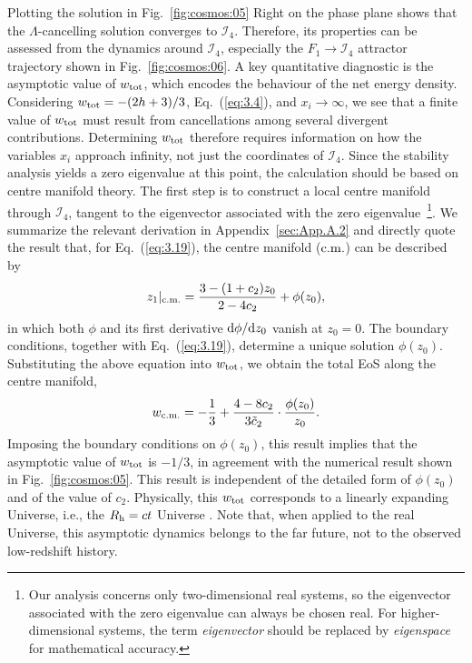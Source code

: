 \documentclass[aps,prd,twocolumn]{revtex4-2}
\newcommand\dx{{\rm d}}
\newcommand\subcm{{\rm c.m.}}
\newcommand\subtot{{\rm tot}}
\begin{document}
Plotting the solution in Fig.~\ref{fig:cosmos:05} Right on the phase plane shows that the $\Lambda$-cancelling solution converges to $\mathcal{I}_4$. Therefore, its properties can be assessed from the dynamics around $\mathcal{I}_4$, especially the $F_1\rightarrow\mathcal{I}_4$ attractor trajectory shown in Fig.~\ref{fig:cosmos:06}. A key quantitative diagnostic is the asymptotic value of $w_\subtot$, which encodes the behaviour of the net energy density. Considering $w_\subtot=-(2h+3)/3$, Eq.~(\ref{eq:3.4}), and $x_i\rightarrow\infty$, we see that a finite value of $w_\subtot$ must result from cancellations among several divergent contributions. Determining $w_\subtot$ therefore requires information on how the variables $x_i$ approach infinity, not just the coordinates of $\mathcal{I}_4$. Since the stability analysis yields a zero eigenvalue at this point, the calculation should be based on centre manifold theory. The first step is to construct a local centre manifold through $\mathcal{I}_4$, tangent to the eigenvector associated with the zero eigenvalue~\footnote{Our analysis concerns only two-dimensional real systems, so the eigenvector associated with the zero eigenvalue can always be chosen real. For higher-dimensional systems, the term \textit{eigenvector} should be replaced by \textit{eigenspace} for mathematical accuracy.}. We summarize the relevant derivation in Appendix~\ref{sec:App.A.2} and directly quote the result that, for Eq.~(\ref{eq:3.19}), the centre manifold ($\subcm$) can be described by
\begin{equation}\label{eq:3.20}
  z_1|_\subcm = \frac{3-(1+c_2)z_0}{2-4c_2} + \phi(z_0),
\end{equation}
in which both $\phi$ and its first derivative $\dx \phi/\dx z_0$ vanish at $z_0=0$. The boundary conditions, together with Eq.~(\ref{eq:3.19}), determine a unique solution $\phi(z_0)$. Substituting the above equation into $w_\subtot$, we obtain the total EoS along the centre manifold,
\begin{equation}\label{eq:3.21}
  w_\subcm = -\frac{1}{3} + \frac{4-8c_2}{3\tilde{c}_2}\cdot\frac{\phi(z_0)}{z_0}.
\end{equation}
Imposing the boundary conditions on $\phi(z_0)$, this result implies that the asymptotic value of $w_\subtot$ is $-1/3$, in agreement with the numerical result shown in Fig.~\ref{fig:cosmos:05}. This result is independent of the detailed form of $\phi(z_0)$ and of the value of $c_2$. Physically, this $w_\subtot$ corresponds to a linearly expanding Universe, i.e., the $R_{\rm h}=ct$ Universe \cite{Melia2012.MNRAS.419.2579}. Note that, when applied to the real Universe, this asymptotic dynamics belongs to the far future, not to the observed low-redshift history.
\end{document}

